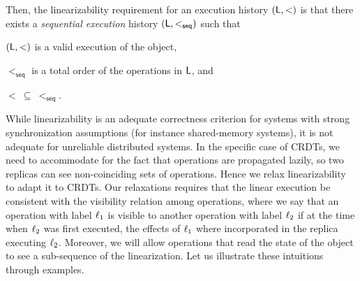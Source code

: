 Then, the linearizability requirement for an execution history
$(\mathsf{L}, <)$ is that there exists a \emph{sequential execution}
history $(\mathsf{L}, <_{\mathsf{seq}})$ such that
\begin{inparaenum}[(i)]
\item $(\mathsf{L}, <)$ is a valid execution of the object,
\item $<_{\mathsf{seq}}$ is a total order of the operations in
  $\mathsf{L}$, and
\item $ <\ \subseteq\ <_{\mathsf{seq}}$.
\end{inparaenum}

While linearizability is an adequate correctness criterion for
systems with strong synchronization assumptions (for instance
shared-memory systems), it is not adequate for unreliable distributed
systems.
%
In the specific case of CRDTs, we need to accommodate for the fact
that operations are propagated lazily, so two replicas can see
non-coinciding sets of operations.
%
Hence we relax linearizability to adapt it to CRDTs.
%
Our relaxations requires that the linear execution be consistent with
the visibility relation among operations, where we say that an
operation with label $\ell_1$ is visible to another operation
with label $\ell_2$ if at the time when $\ell_2$ was
first executed, the effects of $\ell_1$ where incorporated in
the replica executing $\ell_2$.
%
Moreover, we will allow operations that read the state of the object
to see a sub-sequence of the linearization.
%
Let us illustrate these intuitions through examples.


